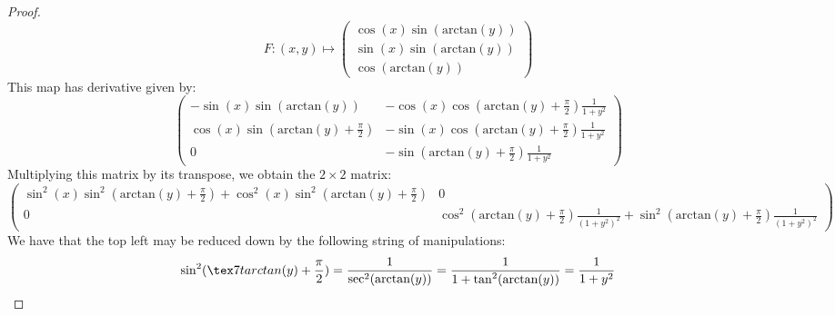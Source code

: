 \documentclass{article}
\begin{document}
\begin{proof}
     \[
       F: (x,y) \mapsto
       \begin{pmatrix}
         \cos(x)\sin(\text{arctan}(y)) \\
         \sin(x)\sin(\text{arctan}(y)) \\
         \cos(\text{arctan}(y))
       \end{pmatrix}
     \]
     This map has derivative given by:
     \[
       \begin{pmatrix}
         -\sin(x)\sin(\text{arctan}(y)) & -\cos(x)\cos(\text{arctan}(y) + \frac{\pi}{2})\frac{1}{1+y^{2}} \\
         \cos(x)\sin(\text{arctan}(y) + \frac{\pi}{2}) & -\sin(x)\cos(\text{arctan}(y) + \frac{\pi}{2})\frac{1}{1+y^{2}}\\
         0 & -\sin(\text{arctan}(y) + \frac{\pi}{2})\frac{1}{1+y^{2}}
       \end{pmatrix}
     \]
     Multiplying this matrix by its transpose, we obtain the $2 \times 2$ matrix:
     \[
       \begin{pmatrix}
         \sin^{2}(x)\sin^{2}(\text{arctan}(y) + \frac{\pi}{2}) + \cos^{2}(x)\sin^{2}(\text{arctan}(y) + \frac{\pi}{2}) & 0 \\
         0 & \cos^{2}(\text{arctan}(y) + \frac{\pi}{2})\frac{1}{(1+y^{2})^{2}} + \sin^{2}(\text{arctan}(y) + \frac{\pi}{2})\frac{1}{(1+y^{2})^{2}}  
         \end{pmatrix}
       \]
       We have that the top left may be reduced down by the following string of manipulations:
       \begin{align*}
         \sin^{2}(\tex7t{arctan}(y) + \frac{\pi}{2}) = \frac{1}{\text{sec}^{2}(\text{arctan}(y))} = \frac{1}{1 + \tan^{2}(\text{arctan}(y))} = \frac{1}{1 + y^{2}}
       \end{align*}
   \end{proof}
\end{document}
